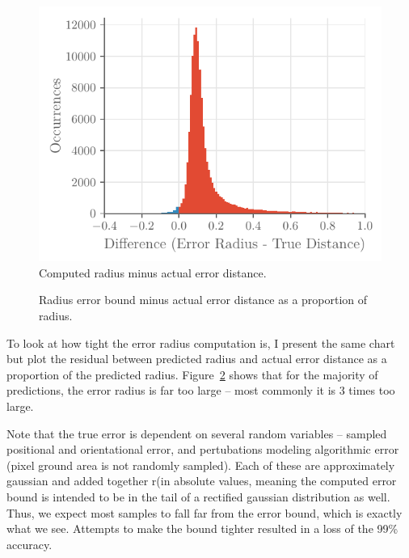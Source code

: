 \documentclass[a4paper,12pt,twoside,openright]{report}
\begin{document}
\begin{figure}[htb]
    \begin{center}
        \includegraphics{figures/camera/diff_radius_true_error.pdf}
    \end{center}
    \caption[Bound Minus True Distance]{Computed radius minus actual error distance.}
    \label{fig:camera:diff bound error}
\end{figure}

\begin{figure}[htb]
    \begin{center}
        
    \end{center}
    \caption[Bound Minus True Distance as a Proportion]{Radius error bound minus actual error distance as a proportion of radius.}
    \label{fig:camera:proportional diff}
\end{figure}

To look at how tight the error radius computation is, I present the same chart
but plot the residual between predicted radius and actual error distance as a 
proportion of the predicted radius. Figure~\ref{fig:camera:proportional diff} shows that for the majority
of predictions, the error radius is far too large -- most commonly it is 3 times 
too large. 

Note that the true error is dependent on several random variables -- sampled positional and orientational
error, and pertubations modeling algorithmic error (pixel ground area is not randomly sampled). Each
of these are approximately gaussian and added together r(in absolute values, meaning the computed error bound is intended to be in the tail
of a rectified gaussian distribution as well. Thus, we expect most samples to
fall far from the error bound, which is exactly what we see.
Attempts to make the bound tighter resulted in a loss of the 99\% accuracy.
\end{document}

